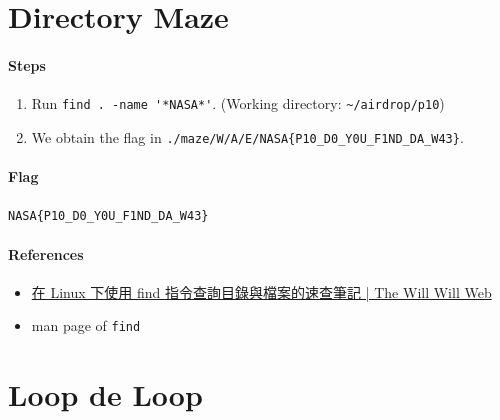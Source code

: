 \documentclass[12pt, a4paper]{article}
\begin{document}
  \section{Directory Maze}
  \paragraph{Steps}
  \begin{enumerate}
    \item Run \verb|find . -name '*NASA*'|.
      (Working directory: \verb|~/airdrop/p10|)
    \item We obtain the flag in
      \verb|./maze/W/A/E/NASA{P10_D0_Y0U_F1ND_DA_W43}|.
  \end{enumerate}
  \paragraph{Flag} \verb|NASA{P10_D0_Y0U_F1ND_DA_W43}|
  \paragraph{References}
  \begin{itemize}
    \item \href{https://blog.miniasp.com/post/2010/08/27/Linux-find-command-tips-and-notice}{在 Linux 下使用 find 指令查詢目錄與檔案的速查筆記 | The Will Will Web}
    \item man page of \verb|find|
  \end{itemize}

  \section{Loop de Loop}
\end{document}
